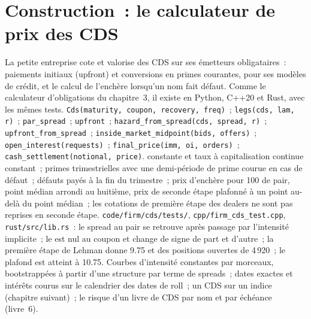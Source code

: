 \section{Construction~: le calculateur de prix des CDS}\label{bld:m2:credit-default-swaps:cds}

\begin{build}
 La petite entreprise cote et valorise des CDS sur ses émetteurs obligataires~: paiements initiaux (upfront)
et conversions en primes courantes,  pour ses modèles de crédit, et le calcul de
l'enchère lorsqu'un nom fait défaut. Comme le calculateur d'obligations du chapitre~3, il existe en
Python, C++20 et Rust, avec les mêmes tests.
 \texttt{Cds(maturity, coupon, recovery, freq)}~;
\texttt{legs(cds, lam, r)}~; \texttt{par\_spread}~; \texttt{upfront}~;
\texttt{hazard\_from\_spread(cds, spread, r)}~; \texttt{upfront\_from\_spread}~;
\texttt{inside\_market\_midpoint(bids, offers)}~; \texttt{open\_interest(requests)}~;
\texttt{final\_price(imm, oi, orders)}~; \texttt{cash\_settlement(notional, price)}.
  constante et taux à capitalisation continue constant~; primes trimestrielles
avec une demi-période de prime courue en cas de défaut~; défauts payés à la fin du
trimestre~; prix d'enchère pour 100 de pair, point médian arrondi au huitième, prix de seconde étape
plafonné à un point au-delà du point médian~; les cotations
de première étape des dealers ne sont pas reprises en seconde étape.
 \texttt{code/firm/cds/tests/}, \texttt{cpp/firm\_cds\_test.cpp},
\texttt{rust/src/lib.rs}~: le spread au pair se retrouve après passage par l'intensité implicite~; le
 est nul au coupon et change de signe de part et d'autre~; la première étape de Lehman donne
9.75 et des positions ouvertes de 4\,920~; le plafond est atteint à 10.75.
 Courbes d'intensité constantes par morceaux, bootstrappées à partir d'une structure par terme
de spreads~; dates exactes et intérêts courus sur le calendrier des dates de roll~; un CDS sur un indice
(chapitre suivant)~; le risque d'un livre de CDS par nom et par échéance (livre~6).
\end{build}

